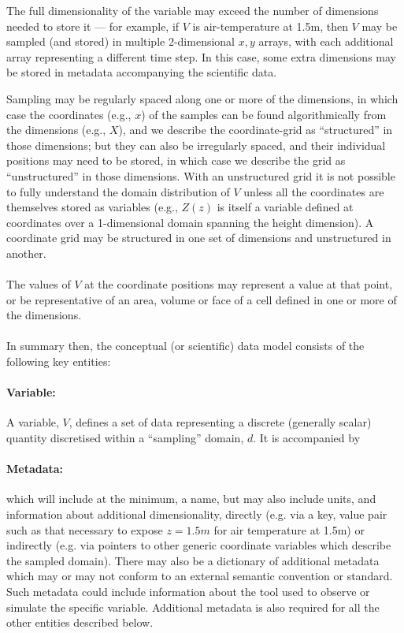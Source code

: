 The full dimensionality of the variable may exceed the number of dimensions needed to store it --- for example, if $V$ is air-temperature at 1.5m, then $V$ may be sampled (and stored) in multiple 2-dimensional $x,y$ arrays, with each additional array representing a different time step.
In this case, some extra dimensions may be stored in metadata accompanying the scientific data.



Sampling may be regularly spaced along one or more of the dimensions, in which case the coordinates (e.g., $x$) of the samples can be found algorithmically from the dimensions (e.g., $X$), and we describe the coordinate-grid as ``structured'' in those dimensions; but they can also be irregularly spaced, and their individual positions may need to be stored, in which case we describe the grid as ``unstructured'' in those dimensions.
With an unstructured grid it is not possible to fully understand the domain distribution of $V$ unless all the coordinates are themselves stored as variables (e.g., $Z(z)$ is itself a variable defined at coordinates over a 1-dimensional domain spanning the height dimension).  A coordinate grid may be structured in one set of dimensions and unstructured in another.

\paragraph{}The values of $V$ at the coordinate positions may represent a value at that point, or be representative of an area, volume or face of a cell defined in one or more of the dimensions.

\paragraph{}In summary then, the conceptual (or scientific) data model consists of the following key entities:

\paragraph {Variable:} A variable, $V$, defines a set of data representing a discrete (generally scalar) quantity discretised within a ``sampling'' domain, $d$.  It is accompanied by

\paragraph {Metadata:} which will include at the minimum, a name, but may also include units, and information about additional dimensionality, directly (e.g. via a key, value pair such as that necessary to expose $z=1.5m$ for air temperature at 1.5m) or indirectly (e.g. via pointers to other generic coordinate variables which describe the sampled domain).   There may also be a dictionary of additional metadata which may or may not conform to an external semantic convention or standard.  Such metadata could include information about the tool used to observe or simulate the specific variable.  Additional metadata is also required for all the other entities described below.

